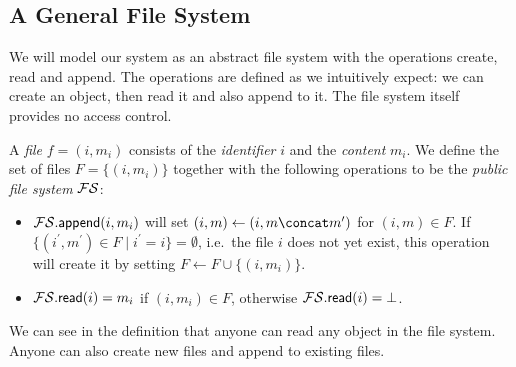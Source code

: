
\subsection{A General File System}\label{FileSystem}

We will model our system as an abstract file system with the operations create, 
read and append.
The operations are defined as we intuitively expect: we can create an object, 
then read it and also append to it.
The file system itself provides no access control.

\begin{definition}\label{FS}
  A \emph{file} \(f = (i, m_i)\) consists of the \emph{identifier} \(i\) and 
  the \emph{content} \(m_i\).
  We define the set of files \(F = \{(i, m_i)\}\) together with the following 
  operations to be the \emph{public file system} \(\FS\):
  \begin{itemize}
    \item \(\fswrite[i][m_i]\) will set \((i, m)\gets (i, m\concat m^\prime)\) 
      for \((i, m)\in F\).
      If \(\{(i^\prime, m^\prime)\in F \mid i^\prime = i\} = \emptyset\), i.e.\ 
      the file \(i\) does not yet exist, this operation will create it by 
      setting \(F\gets F\cup \{(i, m_i)\}\).

    \item \(\fsread[i] = m_i\) if \((i, m_i)\in F\), otherwise \(\fsread[i] 
        = \bot\).

  \end{itemize}
\end{definition}

We can see in the definition that anyone can read any object in the file 
system.
Anyone can also create new files and append to existing files.

%

